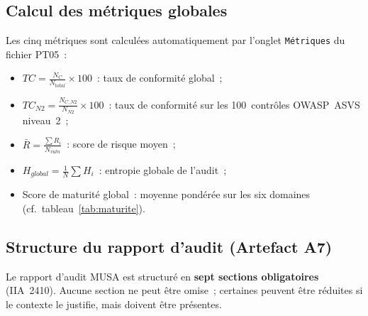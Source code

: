 \documentclass[12pt,a4paper,oneside]{report}
\begin{document}
\subsection{Calcul des m\'etriques globales}

Les cinq m\'etriques sont calcul\'ees automatiquement par l'onglet
\texttt{M\'etriques} du fichier PT05~:

\begin{itemize}[label={\color{gold}}, leftmargin=*, itemsep=4pt]
	\item $TC = \frac{N_C}{N_{total}} \times 100$~: taux de conformit\'e global~;
	\item $TC_{N2} = \frac{N_{C,N2}}{N_{N2}} \times 100$~: taux de conformit\'e
	sur les 100~contr\^oles OWASP~ASVS niveau~2~;
	\item $\bar{R} = \frac{\sum R_i}{N_{vuln}}$~: score de risque moyen~;
	\item $H_{global} = \frac{1}{N}\sum H_i$~: entropie globale de l'audit~;
	\item Score de maturit\'e global~: moyenne pond\'er\'ee sur les six domaines
	(cf.~tableau~\ref{tab:maturite}).
\end{itemize}

\subsection{Structure du rapport d'audit (Artefact A7)}

Le rapport d'audit MUSA est structur\'e en \textbf{sept sections obligatoires}
(IIA~2410). Aucune section ne peut \^etre omise~; certaines peuvent \^etre
r\'eduites si le contexte le justifie, mais doivent \^etre pr\'esentes.
\end{document}
